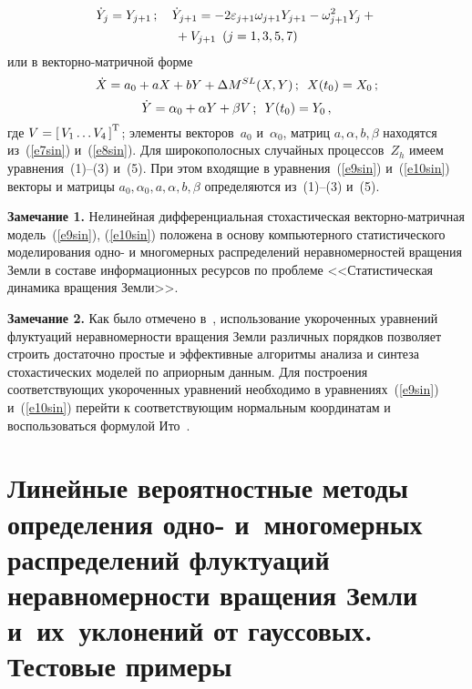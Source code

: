 \begin{multicols}{2}
    \noindent
    \begin{multline}
    \dot Y_j = Y_{j+1}\,;\quad \dot Y_{j+1}= -2\varepsilon_{j+1} \omega_{j+1}Y_{j+1} -
    \omega_{j+1}^2 Y_j +{}\\
    {}+V_{j+1}\enskip(j=1, 3, 5, 7)
    \label{e8sin}
    \end{multline}
или в векторно-матричной форме
\begin{equation}
\dot X = a_0 + aX +bY + \Delta M^{SL} (X,Y)\,;\enskip X(t_0) = X_0\,;
\label{e9sin}
\end{equation}
\begin{equation}
\dot Y=\alpha_0 +\alpha Y +\beta V\,;\enskip Y(t_0) = Y_0\,,
\label{e10sin}
\end{equation}
где $V =\left[\, V_1\ldots V_4\,\right]^{\mathrm{T}}$; элементы векторов~$a_0$ и~$\alpha_0$, матриц $a,\alpha,b,\beta$ находятся 
из~(\ref{e7sin}) и~(\ref{e8sin}).
Для широкополосных  случайных процессов~$Z_h$ имеем уравнения~(1)--(3) и~(5). 
При этом входящие в уравнения~(\ref{e9sin}) и~(\ref{e10sin}) векторы и матрицы
$a_{0}, \alpha_0, a, \alpha, b,\beta$ определяются из~(1)--(3) и~(5).

\smallskip

\noindent
\textbf{Замечание 1.} Нелинейная дифференциальная стохастическая векторно-матричная модель~(\ref{e9sin}), 
(\ref{e10sin}) положена в основу компьютерного статистического моделирования
одно- и многомерных распределений неравномерностей вращения Земли в составе 
информационных ресурсов по проблеме <<Ста\-ти\-сти\-че\-ская динамика вращения Земли>>.

\smallskip

\noindent
\textbf{Замечание 2.} Как было отмечено в~\cite{3sin}, использование укороченных уравнений флуктуаций неравномерности вращения Земли различных порядков позволяет строить
 достаточно простые и эффективные алгоритмы анализа и синтеза стохастических моделей по априорным данным.
 Для построения соответствующих укороченных уравнений необходимо в уравнениях~(\ref{e9sin}) и~(\ref{e10sin}) 
 перейти к со\-от\-вет\-ст\-ву\-ющим нормальным координатам  и воспользоваться формулой Ито~\cite{7sin, 8sin}.

\section{Линейные вероятностные методы определения одно- и~многомерных распределений флуктуаций 
неравномерности вращения Земли и~их~уклонений от гауссовых.
Тестовые примеры}


\end{multicols}
